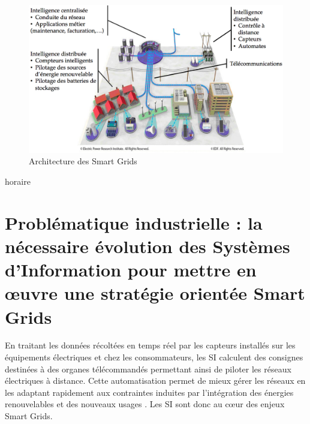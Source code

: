 \begin{figure}[!htbp]
 \begin{center}
  \includegraphics[width=1\textwidth]{images/problematique/archiSmartgrids.png}
 \end{center}
 \caption{Architecture des Smart Grids \protect\cite{favre2006ingenierie}}
 \label{fig:archismartgrids}
\end{figure}


horaire 

\section{Problématique industrielle : la nécessaire évolution des Systèmes 
d'Information pour mettre en œuvre une stratégie orientée Smart Grids}


En traitant les données récoltées en temps réel par les capteurs installés sur 
les équipements électriques et chez les consommateurs, les SI calculent des 
consignes destinées à des organes 
télécommandés permettant ainsi de piloter les réseaux électriques à distance. 
Cette automatisation permet de mieux gérer les réseaux en les adaptant 
rapidement aux contraintes induites par l'intégration des énergies renouvelables 
et des nouveaux usages \cite{cre}. Les SI sont donc au cœur des enjeux Smart Grids.  

